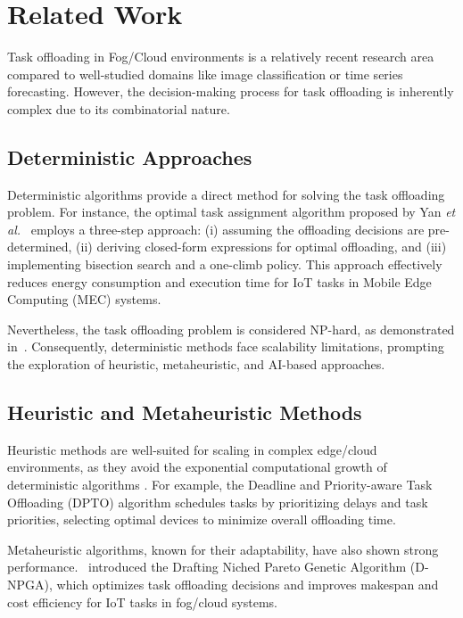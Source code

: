 \documentclass[preprint,3p,authoryear]{elsarticle}
\begin{document}
\section{Related Work}\label{sec:related_work}


Task offloading in Fog/Cloud environments is a relatively recent research area compared to well-studied domains like image classification or time series forecasting. However, the decision-making process for task offloading is inherently complex due to its combinatorial nature.

\subsection{Deterministic Approaches}
Deterministic algorithms provide a direct method for solving the task offloading problem. For instance, the optimal task assignment algorithm proposed by Yan \textit{et al.}~\cite{yan_optimal_2020} employs a three-step approach: (i) assuming the offloading decisions are pre-determined, (ii) deriving closed-form expressions for optimal offloading, and (iii) implementing bisection search and a one-climb policy. This approach effectively reduces energy consumption and execution time for IoT tasks in Mobile Edge Computing (MEC) systems.

Nevertheless, the task offloading problem is considered NP-hard, as demonstrated in~\cite{guo_algorithmics_2024, jin_task_2024, sarkar_deep_2022}. Consequently, deterministic methods face scalability limitations, prompting the exploration of heuristic, metaheuristic, and AI-based approaches.


\subsection{Heuristic and Metaheuristic Methods}

Heuristic methods are well-suited for scaling in complex edge/cloud environments, as they avoid the exponential computational growth of deterministic algorithms \cite{zhang_survey_2024}. For example, the Deadline and Priority-aware Task Offloading (DPTO) algorithm \cite{adhikari_dpto_2020} schedules tasks by prioritizing delays and task priorities, selecting optimal devices to minimize overall offloading time.

Metaheuristic algorithms, known for their adaptability, have also shown strong performance.~\citep{bernard_d-npga_2024} introduced the Drafting Niched Pareto Genetic Algorithm (D-NPGA), which optimizes task offloading decisions and improves makespan and cost efficiency for IoT tasks in fog/cloud systems.
\end{document}
